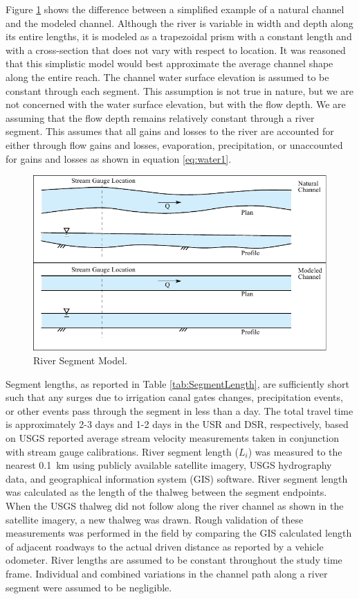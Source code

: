 \begin{linenumbers}
Figure \ref{fig:segment model} shows the difference between a simplified example of a natural channel and the modeled channel.  Although the river is variable in width and depth along its entire lengths, it  is modeled as a trapezoidal prism with a constant length and with a cross-section that does not vary with respect to location.  It was reasoned that this simplistic model would best approximate the average channel shape along the entire reach.  The channel water surface elevation is assumed to be constant through each segment.  This assumption is not true in nature, but we are not concerned with the water surface elevation, but with the flow depth.  We are assuming that the flow depth remains relatively constant through a river segment.  This assumes that all gains and losses to the river are accounted for either through flow gains and losses, evaporation, precipitation, or unaccounted for gains and losses as shown in equation \ref{eq:water1}.
\begin{figure}[htbp]
	\centering
		\includegraphics[width=6.5in]{"Figures/LineDiagram/PlanProfile"}
		\caption[River Segment Model.]{River Segment Model.}
		\label{fig:segment model}
\end{figure}

Segment lengths, as reported in Table \ref{tab:SegmentLength}, are sufficiently short such that any surges due to irrigation canal gates changes, precipitation events, or other events pass through the segment in less than a day.  The total travel time is approximately 2-3 days and 1-2 days in the USR and DSR, respectively, based on USGS reported average stream velocity measurements taken in conjunction with stream gauge calibrations.  River segment length ($L_i$) was measured to the nearest \SI{0.1}{\kilo\meter} using publicly available satellite imagery, USGS hydrography data, and geographical information system (GIS) software.  River segment length was calculated as the length of the thalweg between the segment endpoints.  When the USGS thalweg did not follow along the river channel as shown in the satellite imagery, a new thalweg was drawn.  Rough validation of these measurements was performed in the field by comparing the GIS calculated length of adjacent roadways to the actual driven distance as reported by a vehicle odometer.  River lengths are assumed to be constant throughout the study time frame.  Individual and combined variations in the channel path along a river segment were assumed to be negligible.\\


\end{linenumbers}
